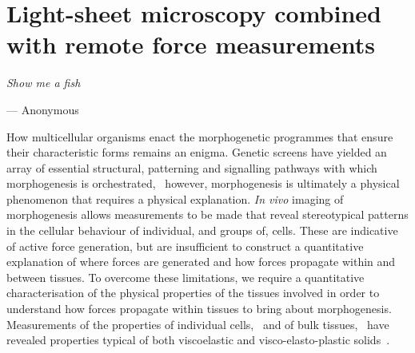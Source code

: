 
\ifpdf
    \graphicspath{{Chapters/tweezers/Figs/Raster/}{Chapters/tweezers/Figs/PDF/}{Chapters/tweezers/Figs/}}
\else
    \graphicspath{{Chapters/tweezers/Figs/Vector/}{Chapters/tweezers/Figs/}}
\fi

\chapter[Light-sheet microscopy combined with remote force measurements]{Light-sheet microscopy combined with remote force measurements}\label{chapter:tweezers}
\epigraph{\emph{Show me a fish}}{--- Anonymous}
How multicellular organisms enact the morphogenetic programmes that ensure their characteristic forms remains an enigma.
Genetic screens have yielded an array of essential structural, patterning and signalling pathways with which morphogenesis is orchestrated,~\cite{gilbertDevelopmentalBiology2000} however, morphogenesis is ultimately a physical phenomenon that requires a physical explanation.
\emph{In vivo} imaging of morphogenesis allows measurements to be made that reveal stereotypical patterns in the cellular behaviour of individual, and groups of, cells.
These are indicative of active force generation, but are insufficient to construct a quantitative explanation of where forces are generated and how forces propagate within and between tissues.
To overcome these limitations, we require a quantitative characterisation of the physical properties of the tissues involved in order to understand how forces propagate within tissues to bring about morphogenesis.
Measurements of the properties of individual cells,~\cite{mammotoMechanicalControlTissue2010} and of bulk tissues,~\cite{mammotoMechanobiologyDevelopmentalControl2013} have revealed properties typical of both viscoelastic and visco-elasto-plastic solids~\cite{heisenbergForcesTissueMorphogenesis2013}.
